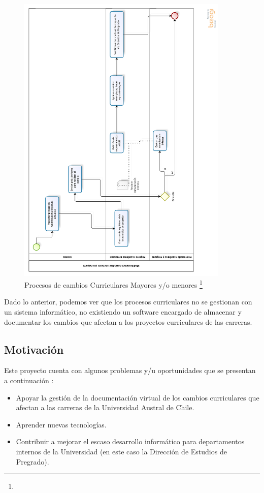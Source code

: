 \documentclass[12pt]{article}
\begin{document}
			\begin{figure}[H]
				\centering
				\includegraphics[width=0.9\textwidth]{Procesos_cambios_curriculares.png}
				\caption[Procesos de cambios Curriculares Mayores y/o menores ]{Procesos de cambios Curriculares Mayores y/o menores  \footnote{}}
				\label{Figura2}
			\end{figure}

\newpage


Dado lo anterior, podemos ver que los procesos curriculares no se gestionan con un sistema informático, no existiendo un software encargado  de almacenar y documentar los cambios que afectan a los proyectos curriculares de las carreras.
		\subsection{Motivación}
		Este proyecto cuenta con algunos problemas y/u oportunidades que se presentan a continuación : \\
		\begin{itemize}
		 \item Apoyar la gestión de la documentación virtual de los cambios curriculares que afectan a 
		 las carreras de la Universidad Austral de Chile.
		 \item Aprender nuevas tecnologías.
		 \item Contribuir a mejorar el escaso desarrollo informático para departamentos internos de la Universidad (en este caso la Dirección de Estudios de Pregrado).

		\end{itemize}
\end{document}
